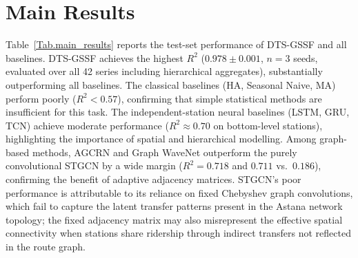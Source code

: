 \section{Main Results}
\label{sec:main_results}

Table~\ref{Tab.main_results} reports the test-set performance of DTS-GSSF and all baselines. DTS-GSSF achieves the highest $R^2$ ($0.978 \pm 0.001$, $n = 3$ seeds, evaluated over all 42 series including hierarchical aggregates), substantially outperforming all baselines. The classical baselines (HA, Seasonal Naive, MA) perform poorly ($R^2 < 0.57$), confirming that simple statistical methods are insufficient for this task. The independent-station neural baselines (LSTM, GRU, TCN) achieve moderate performance ($R^2 \approx 0.70$ on bottom-level stations), highlighting the importance of spatial and hierarchical modelling. Among graph-based methods, AGCRN and Graph WaveNet outperform the purely convolutional STGCN by a wide margin ($R^2 = 0.718$ and $0.711$ vs.\ $0.186$), confirming the benefit of adaptive adjacency matrices. STGCN's poor performance is attributable to its reliance on fixed Chebyshev graph convolutions, which fail to capture the latent transfer patterns present in the Astana network topology; the fixed adjacency matrix may also misrepresent the effective spatial connectivity when stations share ridership through indirect transfers not reflected in the route graph.

